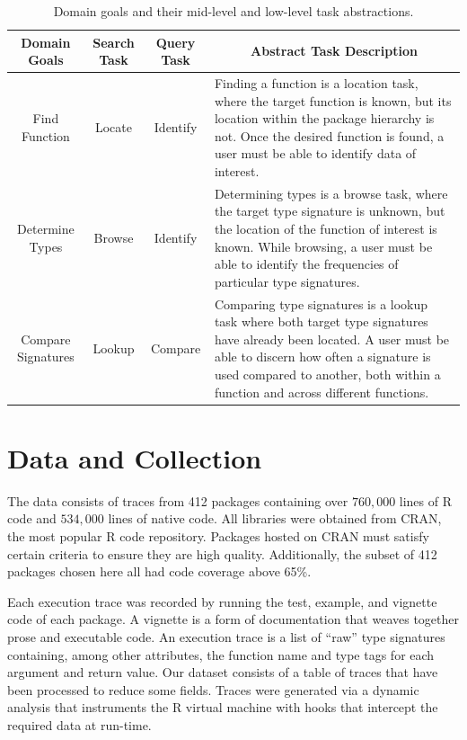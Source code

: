 \documentclass{vgtc}                          %
\begin{document}

\bgroup
\def\arraystretch{1.75}
\begin{table}
  \centering
  \begin{tabularx}{\linewidth}{c|c|c|X}
    Domain Goals & Search Task & Query Task & \multicolumn{1}{c}{Abstract Task Description} \\
    \hline
    Find Function & Locate & Identify & Finding a function is a location task, where the target function is known, but its location within the package hierarchy is not. Once the desired function is found, a user must be able to identify data of interest. \\

    Determine Types & Browse & Identify & Determining types is a browse task, where the target type signature is unknown, but the location of the function of interest is known. While browsing, a user must be able to identify the frequencies of particular type signatures.\\

    Compare Signatures & Lookup & Compare & Comparing type signatures is a lookup task where both target type signatures have already been located. A user must be able to discern how often a signature is used compared to another, both within a function and across different functions.\\
  \end{tabularx}
  \caption{Domain goals and their mid-level and low-level task abstractions.}
  \label{tab:tasks}
\end{table}
\egroup

\section{Data and Collection}


The data consists of traces from 412 packages
containing over $760,000$ lines of R code
and $534,000$ lines of native code.
All libraries were obtained from CRAN,
the most popular R code repository.
Packages hosted on CRAN must satisfy certain criteria
to ensure they are high quality.
Additionally, the subset of 412 packages chosen here
all had code coverage above 65\%.

Each execution trace was recorded by running
the test, example, and vignette code of each package.
A vignette is a form of documentation that weaves
together prose and executable code.
An execution trace is a list of ``raw'' type signatures
containing, among other attributes, the function name
and type tags for each argument and return value.
Our dataset consists of a table of traces
that have been processed to reduce some fields.
Traces were generated via a dynamic analysis
that instruments the R virtual machine with hooks
that intercept the required data at run-time.
\end{document}
